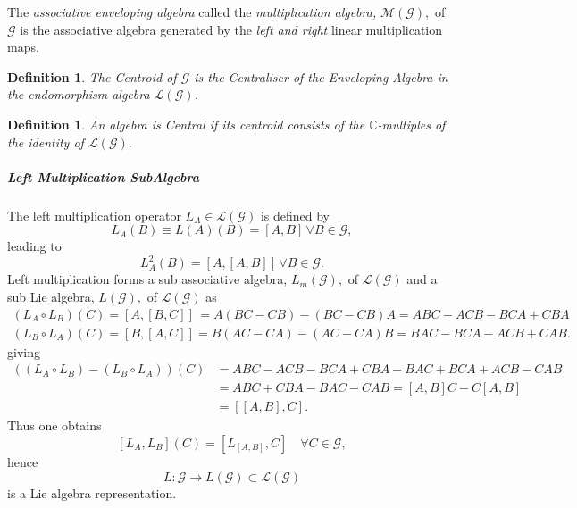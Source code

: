 \documentclass[aps,preprint]{revtex4}%
\newtheorem{definition}[theorem]{Definition}
\begin{document}
The \emph{associative enveloping algebra} called the \emph{multiplication
algebra, }$\mathcal{M}\left(  \mathcal{G}\right)  ,$ of $\mathcal{G}$ is the
associative algebra generated by the \emph{left and right }linear
multiplication maps.

\begin{definition}
The \emph{Centroid of} $\mathcal{G}$ is the \emph{Centraliser} of the
\emph{Enveloping Algebra} in the \emph{endomorphism algebra} $\mathcal{L}%
\left(  \mathcal{G}\right)  $.
\end{definition}

\begin{definition}
An algebra is \emph{Central} if its \emph{centroid }consists of the
$\mathbb{C}$-multiples of the identity of $\mathcal{L}\left(  \mathcal{G}%
\right)  .$
\end{definition}

\subparagraph{Left Multiplication SubAlgebra}

The left multiplication operator $L_{A}\in\mathcal{L}\left(  \mathcal{G}%
\right)  $ is defined by
\begin{equation}
L_{A}\left(  B\right)  \equiv L\left(  A\right)  \left(  B\right)  =\left[
A,B\right]  \,\forall B\in\mathcal{G},
\end{equation}
leading to
\begin{equation}
L_{A}^{2}\left(  B\right)  =\left[  A,\left[  A,B\right]  \right]  \,\forall
B\in\mathcal{G}.
\end{equation}
Left multiplication forms a sub associative algebra, $L_{m}\left(
\mathcal{G}\right)  ,$ of $\mathcal{L}\left(  \mathcal{G}\right)  $ and a sub
Lie algebra, $L\left(  \mathcal{G}\right)  ,$ of $\mathcal{L}\left(
\mathcal{G}\right)  $ as
\begin{gather}
\left(  L_{A}\circ L_{B}\right)  \left(  C\right)  =\left[  A,\left[
B,C\right]  \right]  \,=A\left(  BC-CB\right)  -\left(  BC-CB\right)
A=ABC-ACB-BCA+CBA\\
\left(  L_{B}\circ L_{A}\right)  \left(  C\right)  =\left[  B,\left[
A,C\right]  \right]  =B\left(  AC-CA\right)  -\left(  AC-CA\right)
B=BAC-BCA-ACB+CAB.
\end{gather}
giving%
\begin{align}
\left(  \left(  L_{A}\circ L_{B}\right)  -\left(  L_{B}\circ L_{A}\right)
\right)  \left(  C\right)   &  =ABC-ACB-BCA+CBA-BAC+BCA+ACB-CAB\\
&  =ABC+CBA-BAC-CAB=\left[  A,B\right]  C-C\left[  A,B\right] \\
&  =\left[  \left[  A,B\right]  ,C\right]  .
\end{align}
Thus one obtains
\begin{equation}
\left[  L_{A},L_{B}\right]  \left(  C\right)  =\left[  L_{\left[  A,B\right]
},C\right]  \quad\forall C\in\mathcal{G},
\end{equation}
hence
\begin{equation}
L:\mathcal{G}\rightarrow L\left(  \mathcal{G}\right)  \subset\mathcal{L}%
\left(  \mathcal{G}\right)
\end{equation}
is a Lie algebra representation.
\end{document}
